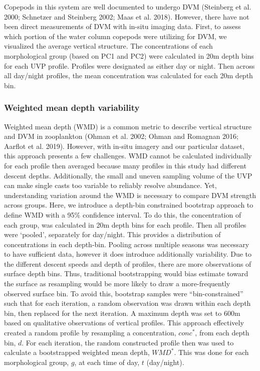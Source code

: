 \documentclass[
]{article}
\begin{document}
Copepods in this system are well documented to undergo DVM (Steinberg et
al. 2000; Schnetzer and Steinberg 2002; Maas et al. 2018). However,
there have not been direct measurements of DVM with in-situ imaging
data. First, to assess which portion of the water column copepods were
utilizing for DVM, we visualized the average vertical structure. The
concentrations of each morphological group (based on PC1 and PC2) were
calculated in 20m depth bins for each UVP profile. Profiles were
designated as either day or night. Then across all day/night profiles,
the mean concentration was calculated for each 20m depth bin.

\hypertarget{weighted-mean-depth-variability}{%
\subsubsection{Weighted mean depth
variability}\label{weighted-mean-depth-variability}}

Weighted mean depth (WMD) is a common metric to describe vertical
structure and DVM in zooplankton (Ohman et al. 2002; Ohman and Romagnan
2016; Aarflot et al. 2019). However, with in-situ imagery and our
particular dataset, this approach presents a few challenges. WMD cannot
be calculated individually for each profile then averaged because many
profiles in this study had different descent depths. Additionally, the
small and uneven sampling volume of the UVP can make single casts too
variable to reliably resolve abundance. Yet, understanding variation
around the WMD is necessary to compare DVM strength across groups. Here,
we introduce a depth-bin constrained bootstrap approach to define WMD
with a 95\% confidence interval. To do this, the concentration of each
group, was calculated in 20m depth bins for each profile. Then all
profiles were `pooled', separately for day/night. This provides a
distribution of concentrations in each depth-bin. Pooling across
multiple seasons was necessary to have sufficient data, however it does
introduce additionally variability. Due to the different descent speeds
and depth of profiles, there are more observations of surface depth
bins. Thus, traditional bootstrapping would bias estimate toward the
surface as resampling would be more likely to draw a more-frequently
observed surface bin. To avoid this, bootstrap samples were
``bin-constrained'' such that for each iteration, a random observation
was drawn within each depth bin, then replaced for the next iteration. A
maximum depth was set to 600m based on qualitative observations of
vertical profiles. This approach effectively created a random profile by
resampling a concentration, \(conc^*\), from each depth bin, \(d\). For
each iteration, the random constructed profile then was used to
calculate a bootstrapped weighted mean depth, \(WMD^*\). This was done
for each morphological group, \(g\), at each time of day, \(t\)
(day/night).
\end{document}
